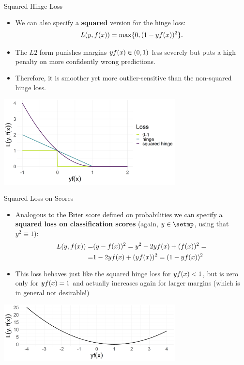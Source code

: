 \begin{vbframe}{Squared Hinge Loss}

\begin{itemize}
  \item We can also specify a \textbf{squared} version for the hinge loss:
  $$L(y, f(x)) = \max \{ 0, (1 - yf(x))^2 \}.$$
  \item The $L2$ form punishes margins $y f(x) \in (0, 1)$ less severely but puts 
  a high penalty on more confidently wrong predictions. 
  \item Therefore, it is smoother yet more outlier-sensitive than the 
  non-squared hinge loss.
\end{itemize}

\begin{center}
\includegraphics[width = 0.7\textwidth]{figure/plot_loss_hinge_squared.png}
\end{center}

\end{vbframe}


\begin{vbframe}{Squared Loss on Scores}


\begin{itemize}
  \item Analogous to the Brier score defined on probabilities we can specify a 
  \textbf{squared loss on classification scores} (again, $y \in \setmp$, using 
  that $y^2 \equiv 1$):
  \begin{eqnarray*}
  L(y, f(x)) = &(y - f(x))^2 = y^2 - 2yf(x) + (f(x))^2 =\\
  = &1 - 2yf(x) + (yf(x))^2 = (1 - yf(x))^2
  \end{eqnarray*}
  \item This loss behaves just like the squared hinge loss for $y f(x) < 1$, but 
  is zero only for $y f(x) = 1$ and actually increases again for larger margins (which is in general not desirable!)
\end{itemize}

\begin{center}
\includegraphics[width = 0.7\textwidth]{figure/plot_loss_squared_scores.png}
\end{center}

\end{vbframe}



